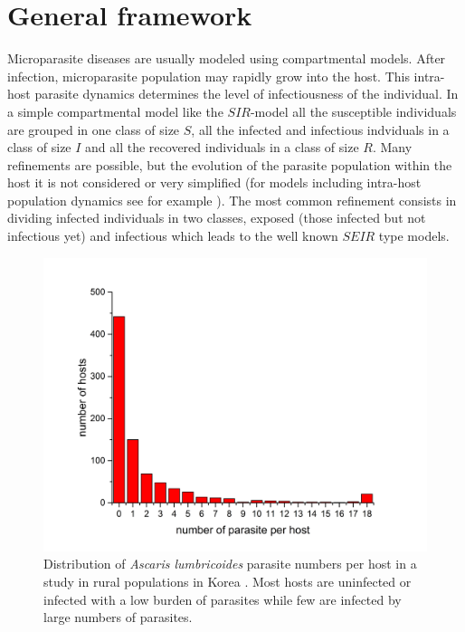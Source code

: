 \documentclass[eng]{MMSB-class-eng}
\begin{document}
\section{General framework}

Microparasite diseases are usually modeled using compartmental models. After infection,  microparasite population may rapidly grow into the host. This intra-host parasite dynamics determines the level of infectiousness of the individual. In a simple compartmental  model like the $SIR$-model  all the susceptible individuals are grouped in one class of size $S$, all the infected and infectious indviduals in a class of size $I$ and all the recovered individuals in a class of size $R$. Many refinements are possible, but the evolution of the parasite population within the host it is not considered or very simplified (for models including intra-host population dynamics 
see for example \citet{gandolfi2015epidemic}).
The most common refinement consists in dividing infected individuals in two classes, exposed (those infected but not infectious yet) and infectious which leads to the well known $SEIR$ type models. 

\begin{figure}[!tb]
	\centering
	\includegraphics[width=0.99\linewidth]{dataseo}
	\caption{Distribution of \textit{Ascaris lumbricoides} parasite numbers per host in a study in rural populations in Korea \citep{seo1979frequency}. Most hosts are uninfected or infected with a low burden of parasites while few are infected by large numbers of parasites.}
	\label{fig:dataseo}
\end{figure}
\end{document}
